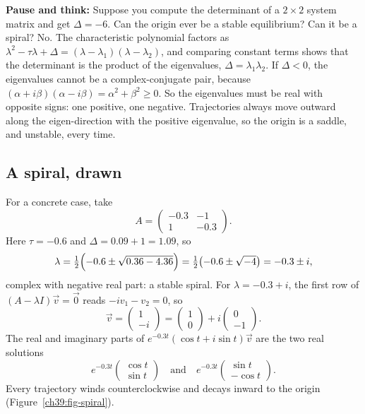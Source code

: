 \begin{walkbox}
\textbf{Pause and think:} Suppose you compute the determinant of a $2\times 2$
system matrix and get $\Delta = -6$. Can the origin ever be a stable equilibrium?
Can it be a spiral? No. The characteristic polynomial factors as
$\lambda^2-\tau\lambda+\Delta=(\lambda-\lambda_1)(\lambda-\lambda_2)$, and
comparing constant terms shows that the determinant is the product of the eigenvalues,
$\Delta = \lambda_1 \lambda_2$. If $\Delta < 0$, the eigenvalues cannot be
a complex-conjugate pair, because $(\alpha+i\beta)(\alpha-i\beta) = \alpha^2+\beta^2 \ge 0$.
So the eigenvalues must be real with opposite signs: one positive, one negative.
Trajectories always move outward along the eigen-direction with the positive
eigenvalue, so the origin is a saddle, and unstable, every time.
\end{walkbox}

\subsection{A spiral, drawn}

For a concrete case, take
\[
  A = \begin{pmatrix} -0.3 & -1 \\ 1 & -0.3\end{pmatrix}.
\]
Here $\tau = -0.6$ and $\Delta = 0.09 + 1 = 1.09$, so
\[
  \lambda = \tfrac12\Bigl(-0.6 \pm \sqrt{0.36 - 4.36}\Bigr)
          = \tfrac12\bigl(-0.6 \pm \sqrt{-4}\bigr) = -0.3 \pm i,
\]
complex with negative real part: a stable spiral. For $\lambda = -0.3 + i$, the first row of
$(A-\lambda I)\vec v = \vec 0$ reads $-i v_1 - v_2 = 0$, so
\[
  \vec v = \begin{pmatrix}1\\-i\end{pmatrix}
  = \begin{pmatrix}1\\0\end{pmatrix} + i\begin{pmatrix}0\\-1\end{pmatrix}.
\]
The real and imaginary parts of $e^{-0.3t}(\cos t + i\sin t)\vec v$ are the two
real solutions
\[
  e^{-0.3t}\begin{pmatrix}\cos t\\ \sin t\end{pmatrix}
  \quad\text{and}\quad
  e^{-0.3t}\begin{pmatrix}\sin t\\ -\cos t\end{pmatrix}.
\]
Every trajectory winds counterclockwise and decays inward to the origin
(Figure~\ref{ch39:fig-spiral}).

